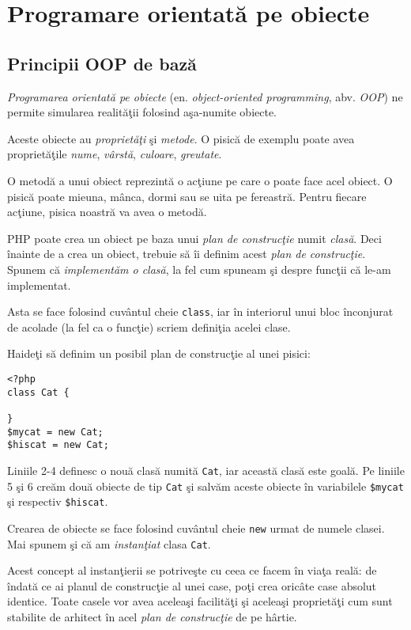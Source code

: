 \chapter{Programare orientată pe obiecte}
\section{Principii OOP de bază}
\textsl{Programarea orientată pe obiecte} (en. \textsl{object-oriented programming}, abv. \textsl{OOP})
ne permite simularea realităţii folosind aşa-numite obiecte.

Aceste obiecte au \textsl{proprietăţi} şi \textsl{metode}. O pisică de exemplu poate avea
proprietăţile \textit{nume}, \textit{vârstă}, \textit{culoare}, \textit{greutate}.

O metodă a unui obiect reprezintă o acţiune pe care o poate face acel obiect. O pisică
poate mieuna, mânca, dormi sau se uita pe fereastră. Pentru fiecare acţiune,
pisica noastră va avea o metodă.

PHP poate crea un obiect pe baza unui \textit{plan de construcţie} numit \textsl{clasă}.
Deci înainte de a crea un obiect, trebuie să îi definim acest \textit{plan de construcţie}.
Spunem că \textit{implementăm o clasă}, la fel cum spuneam şi despre funcţii
că le-am implementat.

Asta se face folosind cuvântul cheie \texttt{class}, iar în interiorul unui bloc înconjurat
de acolade (la fel ca o funcţie) scriem definiţia acelei clase.

Haideţi să definim un posibil plan de construcţie al unei pisici:

\begin{lstlisting}[title=An empty class]
<?php
class Cat {

}
$mycat = new Cat;
$hiscat = new Cat;
\end{lstlisting}

Liniile 2-4 definesc o nouă clasă numită \texttt{Cat}, iar această clasă este goală.
Pe liniile 5 şi 6 creăm două obiecte de tip \texttt{Cat} şi salvăm aceste obiecte
în variabilele \texttt{\$mycat} şi respectiv \texttt{\$hiscat}.

Crearea de obiecte se face folosind cuvântul cheie \texttt{new} urmat de numele clasei.
Mai spunem şi că am \textsl{instanţiat} clasa \texttt{Cat}.

Acest concept al instanţierii se potriveşte cu ceea ce facem în viaţa reală:
de îndată ce ai planul de construcţie al unei case, poţi crea oricâte case
absolut identice. Toate casele vor avea aceleaşi facilităţi şi aceleaşi
proprietăţi cum sunt stabilite de arhitect în acel \textit{plan de construcţie}
de pe hârtie.

